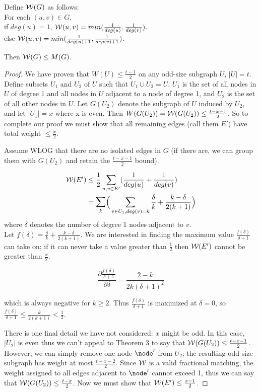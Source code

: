 \begin{lemma}
Define $\mathcal {W}(G)$ as follows:\\
For each $(u,v) \in G$,\\
if $deg(u) = 1$, $\mathcal {W}(u,v) =  min(\frac{1}{deg(u)},\frac{1}{deg(v)})$.\\
else $\mathcal {W}(u,v) =  min(\frac{1}{deg(u)+1},\frac{1}{deg(v)+1})$.

Then $\mathcal {W}(G) \leq M(G)$.
\end{lemma}
\begin{proof}
We have proven that $W(U)\leq \frac{t-1}{2}$ on any odd-size subgraph $U$, $|U| = t$.  Define subsets $U_1$ and $U_2$ of $U$ such that $U_1 \cup U_2 = U$.  $U_1$ is the set of all nodes in $U$ of degree 1 and all nodes in $U$ adjacent to a node of degree 1, and $U_2$ is the set of all other nodes in $U$.  Let $G(U_2)$ denote the subgraph of $U$ induced by $U_2$, and let $|U_1| = x$ where x is even.  Then $W(G(U_2)) = \mathcal {W}(G(U_2)) \leq \frac{t-x-1}{2}$.  So to complete our proof we must show that all remaining edges (call them $E'$) have total weight $\leq \frac{x}{2}$.

Assume WLOG that there are no isolated edges in $G$ (if there are, we can group them with $G(U_2)$ and retain the $\frac{t-x-1}{2}$ bound).

\begin{align*}
\W(E') & \leq \frac{1}{2} \sum_{u,v \in E'} (\frac{1}{deg(u)}+\frac{1}{deg(v)})\\
& = \mathlarger{\sum_k} \Big(\sum_{v \in U_1, deg(v) = k} \frac{\delta}{k} + \frac{k-\delta}{2(k+1)}\Big)
\end{align*}
where $\delta$ denotes the number of degree 1 nodes adjacent to $v$.\\
Let $f(\delta) = \frac{\delta}{k} + \frac{k-\delta}{2(k+1)}$.  We are interested in finding the maximum value $\frac{f(\delta)}{\delta+1}$ can take on; if it can never take a value greater than $\frac{1}{2}$ then $\mathcal {W}(E')$ cannot be greater than $\frac{x}{2}$.

$$\frac{\partial\frac{f(\delta)}{\delta+1}}{\partial \delta} = \frac{2-k}{2k(\delta+1)^2}$$

which is always negative for $k \geq 2$.  Thus $\frac{f(\delta)}{\delta+1}$ is maximized at $\delta = 0$, so  $\frac{f(\delta)}{\delta+1} \leq \frac{k}{2(k+1)} < \frac{1}{2}.$

There is one final detail we have not considered: $x$ might be odd.  In this case, $|U_2|$ is even thus we can't appeal to Theorem 3 to say that $\mathcal {W}(G(U_2)) \leq \frac{t-x-1}{2}$.  However, we can simply remove one node $\node'$ from $U_2$; the resulting odd-size subgraph has weight at most $\frac{t-x-2}{2}$.  Since $\mathcal {W}$ is a valid fractional matching, the weight assigned to all edges adjacent to $\node'$ cannot exceed 1, thus we can say that $\mathcal {W}(G(U_2)) \leq \frac{t-x}{2}$.  Now we must show that $\mathcal {W}(E') \leq \frac{x-1}{2}$.


\end{proof}
